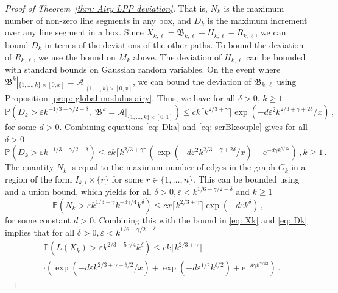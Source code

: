 \documentclass[11pt, reqno]{amsart}
\numberwithin{equation}{section}
\newcommand{\PP}{\ensuremath{\mathbb{P}}}
\newcommand{\ceil}[1]{\lceil #1 \rceil}
\begin{document}
\begin{proof}[Proof of Theorem~\ref{thm: Airy LPP deviation}]
That is, $N_k$ is the maximum number of non-zero line segments in any box, and $D_k$ is the maximum increment over any line segment in a box. Since $X_{k, \ell} = \mathfrak{B}_{k, \ell} - H_{k, \ell} - R_{k, \ell}$, we can bound $D_k$ in terms of the deviations of the other paths. To bound the deviation of $R_{k, \ell}$, we use the bound on $M_k$ above. The deviation of $H_{k, \ell}$ can be bounded with standard bounds on Gaussian random variables. On the event where $\mathfrak{B}^k|_{\{1, \dots, k\} \times [0, x]} = \mathcal{A}|_{\{1, \dots, k\} \times [0, x]}$, we can bound the deviation of $\mathfrak{B}_{k, \ell}$ using Proposition \ref{prop: global modulus airy}. Thus, we have for all $\delta >0$, $k\ge 1$
\begin{equation}
\label{eq: Dka}
\PP\left(D_k > \varepsilon k^{-1/3 - \gamma/2+\delta }, \; \mathfrak{B}^k = \mathcal{A}|_{\{1, \dots, k\} \times [0, 1]} \right) \le c k\ceil{k^{2/3+\gamma}}\exp \left(-d\varepsilon^2  k^{2/3+\gamma + 2\delta}/x\right)\,,
\end{equation}
for some $d>0$. Combining equations \eqref{eq: Dka} and \eqref{eq: scrBkcouple} gives for all $\delta >0$
\begin{equation}
\label{eq: Dk}
\PP\left(D_k > \varepsilon k^{-1/3 - \gamma/2 +\delta}\right) \le c k\ceil{k^{2/3+\gamma}} \left(\exp \left(-d \varepsilon^2 k^{2/3+\gamma + 2\delta}/x\right) + \mathrm{e}^{-d\gamma k^{\gamma/12}}\right)\,, k\ge 1\,.
\end{equation}
The quantity $N_k$ is equal to the maximum number of edges in the graph $G_k$ in a region of the form $I_{k, i} \times \{r\}$ for some $r \in \{1, \dots, n\}$. This can be bounded using \cite[Proposition 6.7]{DOV} and a union bound, which yields for all $\delta > 0, \varepsilon < k ^{1/6-\gamma/2 - \delta}$ and $k\ge 1$
$$
\PP \left(N_k > \varepsilon k^{1/3 - \gamma} k^{- 3 \gamma/4} k^{\delta} \right) \le c x\ceil{k^{2/3+\gamma}} \exp(-d \varepsilon k^\delta)\,,
$$
for some constant $d>0$. Combining this with the bound in \eqref{eq: Xk} and \eqref{eq: Dk} implies that for all $\delta > 0, \varepsilon < k ^{1/6-\gamma/2 - \delta}$
\begin{align}
\label{eq: Mk-2}
&\PP\left(L(X_k) > \varepsilon k^{2/3 - 5\gamma/4} k^{\delta} \right) \le c k \ceil{k^{2/3+\gamma}} \\
&\cdot \left(\exp \left(-d \varepsilon k^{2/3+\gamma + \delta/2}/x\right) + \exp(-d\varepsilon^{1/2}  k^{\delta/2}) + \mathrm{e}^{-d\gamma k^{\gamma/12}}\right)\,.\nonumber
\end{align}


\end{proof}
\end{document}
